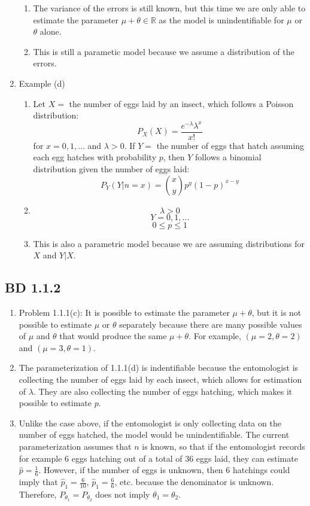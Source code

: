 \documentclass[a4paper,12pt]{article}
\begin{document}
\begin{enumerate}
\begin{enumerate}
      \item The variance of the errors is still known, but this time we are only able to estimate the parameter $\mu+\theta\in\mathbb{R}$ as the model is unindentifiable for $\mu$ or $\theta$ alone.
      \item This is still a parametic model because we assume a distribution of the errors.
    \end{enumerate}
    \item Example (d)
    \begin{enumerate}
       \item Let $X=$ the number of eggs laid by an insect, which follows a Poisson distribution:$$P_X(X)=\frac{e^{-\lambda}\lambda^x}{x!}$$ for $x=0,1,...$ and $\lambda>0$. If $Y=$ the number of eggs that hatch assuming each egg hatches with probability $p$, then $Y$ follows a binomial distribution given the number of eggs laid:$$P_Y(Y|n=x)={x\choose y}p^y(1-p)^{x-y}$$
       \item $$\lambda>0$$ $$Y=0,1,...$$ $$0\leq p\leq 1$$
       \item This is also a parametric model because we are assuming distributions for $X$ and $Y|X$.
     \end{enumerate}
\end{enumerate}
\subsection{BD 1.1.2}
\begin{enumerate}
  \item Problem 1.1.1(c): It is possible to estimate the parameter $\mu+\theta$, but it is not possible to estimate $\mu$ or $\theta$ separately because there are many possible values of $\mu$ and $\theta$ that would produce the same $\mu+\theta$. For example, $(\mu=2,\theta=2)$ and $(\mu=3,\theta=1)$.
  \item The parameterization of 1.1.1(d) is indentifiable because the entomologist is collecting the number of eggs laid by each insect, which allows for estimation of $\lambda$. They are also collecting the number of eggs hatching, which makes it possible to estimate $p$.
  \item Unlike the case above, if the entomologist is only collecting data on the number of eggs hatched, the model would be unindentifiable. The current parameterization assumes that $n$ is known, so that if the entomologist records for example 6 eggs hatching out of a total of 36 eggs laid, they can estimate $\hat{p}=\frac{1}{6}$. However, if the number of eggs is unknown, then 6 hatchings could imply that $\hat{p}_1=\frac{6}{10}$, $\hat{p}_1=\frac{6}{6}$, etc. because the denominator is unknown. Therefore, $P_{\theta_1}=P_{\theta_2}$ does not imply $\theta_1=\theta_2$.
\end{enumerate}
\end{document}
